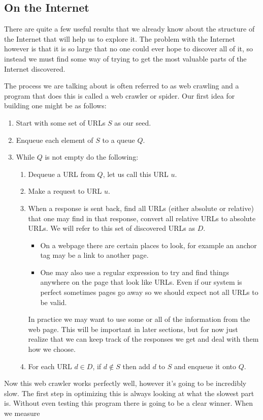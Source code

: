 \documentclass{article}
\begin{document}
	\subsection{On the Internet}
	There are quite a few useful results that we already know about the structure of the Internet that will help us to explore it. The problem with the Internet however is that it is so large that no one could ever hope to discover all of it, so instead we must find some way of trying to get the most valuable parts of the Internet discovered.
	
	The process we are talking about is often referred to as web crawling and a program that does this is called a web crawler or spider. Our first idea for building one might be as follows:
	\begin{enumerate}
		\item Start with some set of URLs $S$ as our seed. 
		\item Enqueue each element of $S$ to a queue $Q$.
		\item While $Q$ is not empty do the following:
		\begin{enumerate}
			\item Dequeue a URL from $Q$, let us call this URL $u$.
			\item Make a request to URL $u$.
			\item When a response is sent back, find all URLs (either absolute or relative) that one may find in that response, convert all relative URLs to absolute URLs. We will refer to this set of discovered URLs as $D$.
			\begin{itemize}
				\item On a webpage there are certain places to look, for example an anchor tag may be a link to another page.
				\item One may also use a regular expression to try and find things anywhere on the page that look like URLs. Even if our system is perfect sometimes pages go away so we should expect not all URLs to be valid.
			\end{itemize}
			In practice we may want to use some or all of the information from the web page. This will be important in later sections, but for now just realize that we can keep track of the responses we get and deal with them how we choose.
			\item For each URL $d\in D$, if $d \not\in S$ then add $d$ to $S$ and enqueue it onto $Q$.
		\end{enumerate}
	\end{enumerate}
	
	Now this web crawler works perfectly well, however it's going to be incredibly slow. The first step in optimizing this is always looking at what the slowest part is. Without even testing this program there is going to be a clear winner. When we measure 
	
	
\end{document}
